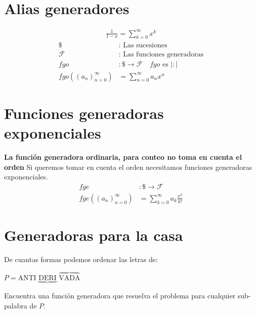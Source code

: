 \documentclass[../main.tex]{subfiles}
\begin{document}
\section{Alias generadores}%
\label{sec:alias_generadores}

\begin{gather*}
	\frac{1}{1-x} = \sum_{k=0}^\infty x^k
\end{gather*}
\begin{align*}
	\$ &: \text{ Las sucesiones}\\
	\mathcal{F} &: \text{ Las funciones generadoras}\\
	fgo&: \$ \longrightarrow \mathcal{F}
	\quad fgo\text{ es }|:|\\
	fgo((a_n)_{n=0}^\infty) &=
	\sum_{n=0}^\infty a_n x^n
\end{align*}

\section{Funciones generadoras exponenciales}%
\label{sec:funciones_generadoras_exponenciales}

\textbf{
	La función generadora ordinaria,
	para conteo no toma en cuenta el orden
}
Si queremos tomar en cuenta el orden necesitamos funciones
generadoras exponenciales.
\begin{align*}
	fge &: \$ \longrightarrow \mathcal{F}\\
	fge((a_n)_{n=0}^\infty) &=
	\sum_{k=0}^\infty a_k \frac{x^k}{k!}
\end{align*}

\section{Generadoras para la casa}%
\label{sec:generadoras_para_la_casa}

De cuantas formas podemos ordenar las letras de:


{
	\centering%
	\Huge
	$P=$ANTI
	\(
		\underbrace
		{
			\text{DERI}
		}
	\)
	\(
		\overbrace
		{
			\text{VADA}
		}
	\)

}
Encuentra  una función generadora que resuelva el problema para
cualquier sub-palabra de $P$.
\end{document}
